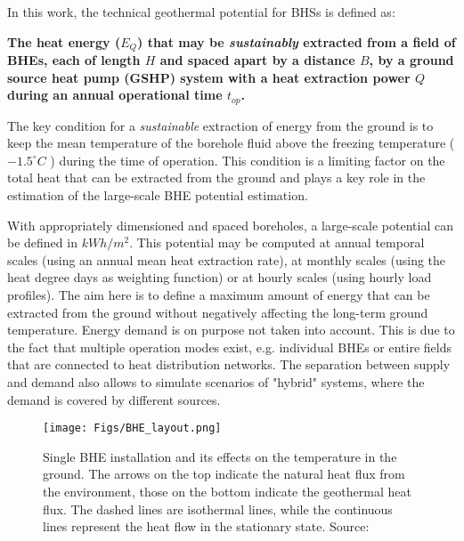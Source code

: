 In this work, the technical geothermal potential for BHSs is defined as:

\textbf{The heat energy ($E_Q$) that may be \textit{sustainably} extracted from a field of BHEs, each of length $H$ and spaced apart by a distance $B$, by a ground source heat pump (GSHP) system with a heat extraction power $Q$ during an annual operational time $t_{op}$. }

The key condition for a \textit{sustainable} extraction of energy from the ground is to keep the mean temperature of the borehole fluid above the freezing temperature ($-1.5^\circ C$ \citep{wagner_erdsondenpotenzial_2014}) during the time of operation. This condition is a limiting factor on the total heat that can be extracted from the ground and plays a key role in the estimation of the large-scale BHE potential estimation.

With appropriately dimensioned and spaced boreholes, a large-scale potential can be defined in $kWh/m^2$. This potential may be computed at annual temporal scales (using an annual mean heat extraction rate), at monthly scales (using the heat degree days as weighting function) or at hourly scales (using hourly load profiles).
The aim here is to define a maximum amount of energy that can be extracted from the ground without negatively affecting the long-term ground temperature. Energy demand is on purpose not taken into account. 
This is due to the fact that multiple operation modes exist, e.g. individual BHEs or entire fields that are connected to heat distribution networks. The separation between supply and demand also allows to simulate scenarios of "hybrid" systems, where the demand is covered by different sources.

\begin{figure}
    \centering
    \texttt{[image: Figs/BHE\_layout.png]}
    \caption[Single BHE installation and its effects on the temperature in the ground.]{Single BHE installation and its effects on the temperature in the ground. The arrows on the top indicate the natural heat flux from the environment, those on the bottom indicate the geothermal heat flux. The dashed lines are isothermal lines, while the continuous lines represent the heat flow in the stationary state. Source: \citet{wagner_erdsondenpotenzial_2014}}
    \label{fig:BHE}
\end{figure}

